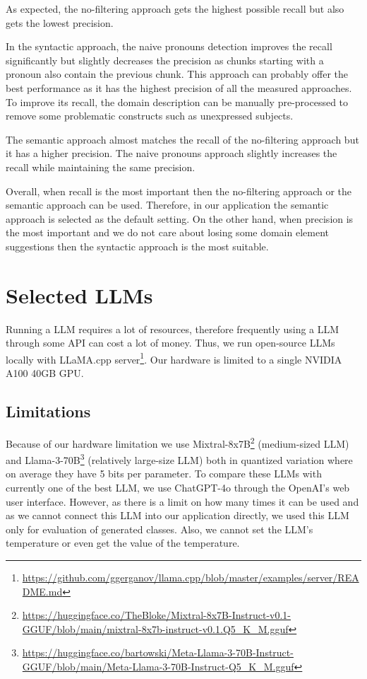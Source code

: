 As expected, the no-filtering approach gets the highest possible recall but also gets the lowest precision.

In the syntactic approach, the naive pronouns detection improves the recall significantly but slightly decreases the precision as chunks starting with a pronoun also contain the previous chunk. This approach can probably offer the best performance as it has the highest precision of all the measured approaches. To improve its recall, the domain description can be manually pre-processed to remove some problematic constructs such as unexpressed subjects.

The semantic approach almost matches the recall of the no-filtering approach but it has a higher precision. The naive pronouns approach slightly increases the recall while maintaining the same precision.

Overall, when recall is the most important then the no-filtering approach or the semantic approach can be used. Therefore, in our application the semantic approach is selected as the default setting. On the other hand, when precision is the most important and we do not care about losing some domain element suggestions then the syntactic approach is the most suitable.


\section{Selected LLMs}

Running a LLM requires a lot of resources, therefore frequently using a LLM through some API can cost a lot of money. Thus, we run open-source LLMs locally with LLaMA.cpp server\footnote{\url{https://github.com/ggerganov/llama.cpp/blob/master/examples/server/README.md}}. Our hardware is limited to a single NVIDIA A100 40GB GPU.


\subsection{Limitations}

Because of our hardware limitation we use Mixtral-8x7B\footnote{\url{https://huggingface.co/TheBloke/Mixtral-8x7B-Instruct-v0.1-GGUF/blob/main/mixtral-8x7b-instruct-v0.1.Q5_K_M.gguf}} (medium-sized LLM) \cite{Jiang2024} and Llama-3-70B\footnote{\url{https://huggingface.co/bartowski/Meta-Llama-3-70B-Instruct-GGUF/blob/main/Meta-Llama-3-70B-Instruct-Q5_K_M.gguf}} (relatively large-size LLM) both in quantized variation where on average they have 5 bits per parameter. To compare these LLMs with currently one of the best LLM, we use ChatGPT-4o through the OpenAI's web user interface. However, as there is a limit on how many times it can be used and as we cannot connect this LLM into our application directly, we used this LLM only for evaluation of generated classes. Also, we cannot set the LLM's temperature or even get the value of the temperature.


